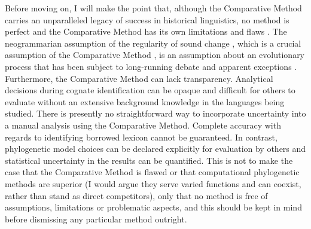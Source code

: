 Before moving on, I will make the point that, although the Comparative Method carries an unparalleled legacy of success in historical linguistics, no method is perfect and the Comparative Method has its own limitations and flaws \autocite[see][]{durie_comparative_1996}. The neogrammarian assumption of the regularity of sound change \autocite{osthoff_morphologische_1878}, which is a crucial assumption of the Comparative Method \autocite[p.~166]{campbell_historical_2004}, is an assumption about an evolutionary process that has been subject to long-running debate \autocite{labov_regularity_2020} and apparent exceptions \autocites[see][]{chen_sound_1975}{wang_lexicon_1977}{durie_comparative_1996}{miceli_where_nodate}. Furthermore, the Comparative Method can lack transparency. Analytical decisions during cognate identification can be opaque and difficult for others to evaluate without an extensive background knowledge in the languages being studied. There is presently no straightforward way to incorporate uncertainty into a manual analysis using the Comparative Method. Complete accuracy with regards to identifying borrowed lexicon cannot be guaranteed. In contrast, phylogenetic model choices can be declared explicitly for evaluation by others and statistical uncertainty in the results can be quantified. This is not to make the case that the Comparative Method is flawed or that computational phylogenetic methods are superior (I would argue they serve varied functions and can coexist, rather than stand as direct competitors), only that no method is free of assumptions, limitations or problematic aspects, and this should be kept in mind before dismissing any particular method outright.

